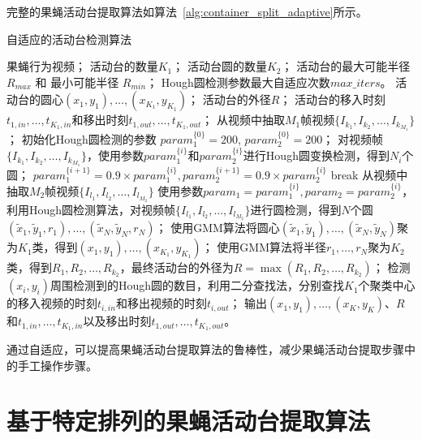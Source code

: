 完整的果蝇活动台提取算法如算法~\ref{alg:container_split_adaptive}所示。
\begin{algorithm}
    \caption{自适应的活动台检测算法}
    \label{alg:container_split_adaptive}
\begin{algorithmic}[1]
\INPUT
    \Statex 果蝇行为视频；
    \Statex 活动台的数量$K_1$；
    \Statex 活动台圆的数量$K_2$；
    \Statex 活动台的最大可能半径$R_{max}$ 和 最小可能半径 $R_{min}$；
    \Statex Hough圆检测参数最大自适应次数$max\_iters$。
\OUTPUT
    \Statex 活动台的圆心$(x_1, y_1), \ldots, (x_{K_1},y_{K_1})$；
    \Statex 活动台的外径$R$；
    \Statex 活动台的移入时刻$t_{1, in}, \ldots, t_{K_1, in}$和移出时刻$t_{1, out}, \ldots, t_{K_1, out}$；
\State 从视频中抽取$M_1$帧视频$\{ I_{k_1}, I_{k_2}, \ldots, I_{k_{M_1}} \}$；
\State 初始化Hough圆检测的参数 $param_1^{\{0\}} = 200$, $param_2^{\{0\}} = 200$；
    \State 对视频帧$\{ I_{k_1}, I_{k_2}, \ldots, I_{k_{M_1}} \}$，使用参数$param^{\{i\}}_1$和$param^{\{i\}}_2$进行Hough圆变换检测，得到$N_i$个圆；
        \State $param_1^{\{i+1\}} = 0.9\times param_1^{\{i\}}, param_2^{\{i+1\}} = 0.9\times param_2^{\{i\}}$
    \Else
        \State break
    \EndIf
\EndFor
\State 从视频中抽取$M_2$帧视频$\{ I_{l_1}, I_{l_2}, \ldots, I_{l_{M_2}} \}$
\State 使用参数$param_1 = param_1^{\{i\}}, param_2 = param_2^{\{i\}}$，利用Hough圆检测算法，对视频帧$\{ I_{l_1}, I_{l_2}, \ldots, I_{l_{M_2}} \}$进行圆检测，得到$N$个圆 $(\tilde{x}_1, \tilde{y}_1, r_1), \ldots, (\tilde{x}_N, \tilde{y}_N, r_N)$；
\State 使用GMM算法\cite{GMM_1999}将圆心$(\tilde{x}_1, \tilde{y}_1), \ldots, (\tilde{x}_N, \tilde{y}_N)$聚为$K_1$类，得到$(x_1, y_1), \ldots, (x_{K_1},y_{K_1})$；\label{alg:arena:clusterXY}
\State 使用GMM算法将半径$r_1, \ldots, r_N$聚为$K_2$类，得到$R_1, R_2, \ldots, R_{k_2}$，最终活动台的外径为$R = \max(R_1, R_2, \ldots, R_{k_2})$；\label{alg:arena:clusterR}
\State 检测$(x_i, y_i)$周围检测到的Hough圆的数目，利用二分查找法，分别查找$K_1$个聚类中心的移入视频的时刻$t_{i,in}$和移出视频的时刻$t_{i, out}$；
\State 输出$(x_1, y_1),\ldots,(x_K, y_K)$、$R$和$t_{1, in}, \ldots, t_{K_1, in}$以及移出时刻$t_{1, out}, \ldots, t_{K_1, out}$。
\end{algorithmic}
\end{algorithm}

通过自适应，可以提高果蝇活动台提取算法的鲁棒性，减少果蝇活动台提取步骤中的手工操作步骤。

\section{基于特定排列的果蝇活动台提取算法} \label{sec:container_split_fixed_array}

